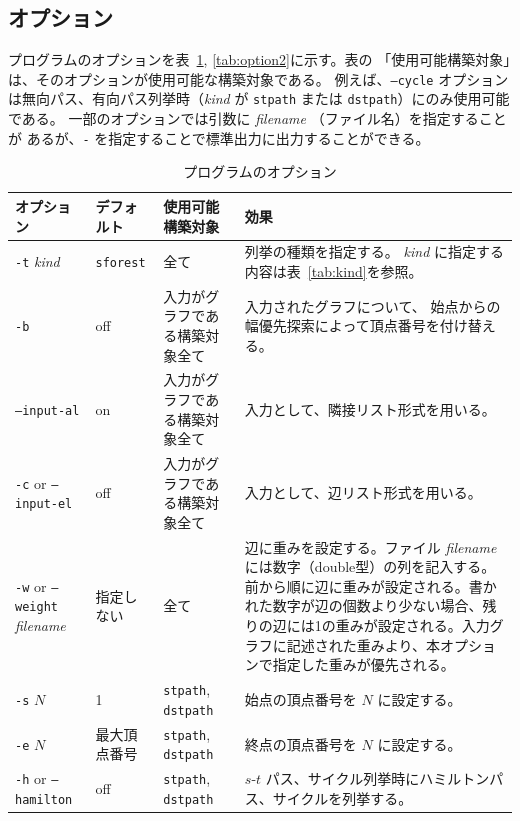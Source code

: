 \documentclass{jsarticle}
\begin{document}
\subsection{オプション}

プログラムのオプションを表~\ref{tab:option}, \ref{tab:option2}に示す。表の
「使用可能構築対象」は、そのオプションが使用可能な構築対象である。
例えば、\texttt{--cycle} オプションは無向パス、有向パス列挙時（\textit{kind} が
\texttt{stpath} または \texttt{dstpath}）にのみ使用可能である。
一部のオプションでは引数に \textit{filename} （ファイル名）を指定することが
あるが、\texttt{-} を指定することで標準出力に出力することができる。

\begin{table}
\caption{プログラムのオプション}
\label{tab:option}
\begin{center}
\begin{tabular}[t]{|p{120pt}|p{50pt}|p{80pt}|p{180pt}|}
\hline%
オプション & デフォルト & 使用可能構築対象 & 効果 \\ \hline \hline
\texttt{-t} \textit{kind} & \texttt{sforest} & 全て & 列挙の種類を指定する。
                            \textit{kind} に指定する内容は表~\ref{tab:kind}を参照。 \\ \hline
\texttt{-b} & off & 入力がグラフである構築対象全て & 入力されたグラフについて、
                    始点からの幅優先探索によって頂点番号を付け替える。 \\ \hline
\texttt{--input-al} & on & 入力がグラフである構築対象全て & 入力として、隣接リスト形式を用いる。 \\ \hline
\texttt{-c} or \texttt{--input-el} & off & 入力がグラフである構築対象全て & 入力として、辺リスト形式を用いる。 \\ \hline
\texttt{-w} or \texttt{--weight} \textit{filename} & 指定しない & 全て & 辺に重みを設定する。ファイル \textit{filename} には数字（double型）の列を記入する。前から順に辺に重みが設定される。書かれた数字が辺の個数より少ない場合、残りの辺には1の重みが設定される。入力グラフに記述された重みより、本オプションで指定した重みが優先される。 \\ \hline
\texttt{-s} $N$ & 1 & \texttt{stpath}, \texttt{dstpath} & 始点の頂点番号を $N$ に設定する。 \\ \hline
\texttt{-e} $N$ & 最大頂点番号 & \texttt{stpath}, \texttt{dstpath} & 終点の頂点番号を $N$ に設定する。 \\ \hline
\texttt{-h} or \texttt{--hamilton}& off & \texttt{stpath}, \texttt{dstpath} & $s$-$t$ パス、サイクル列挙時にハミルトンパス、サイクルを列挙する。 \\ \hline

\end{tabular}
\end{center}
\end{table}
\end{document}
